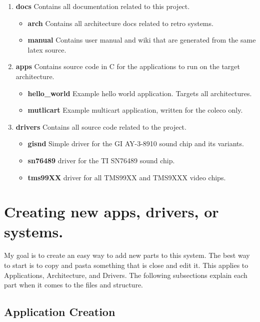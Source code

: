 \documentclass{article}
\begin{document}
  \begin{enumerate}
    \item \textbf{docs} Contains all documentation related to this project.
      \begin{itemize}
        \item \textbf{arch} Contains all architecture docs related to retro systems.
        \item \textbf{manual} Contains user manual and wiki that are generated from the same latex source.
      \end{itemize}
    \item \textbf{apps} Contains source code in C for the applications to run on the target architecture.
      \begin{itemize}
        \item \textbf{hello\_world} Example hello world application. Targets all architectures.
        \item \textbf{mutlicart} Example multicart application, written for the coleco only.
      \end{itemize}
    \item \textbf{drivers} Contains all source code related to the project.
      \begin{itemize}
        \item \textbf{gisnd} Simple driver for the GI AY-3-8910 sound chip and its variants.
        \item \textbf{sn76489} driver for the TI SN76489 sound chip.
        \item \textbf{tms99XX} driver for all TMS99XX and TMS9XXX video chips.
      \end{itemize}
  \end{enumerate}

  \newpage

  \section{Creating new apps, drivers, or systems.}

  \par
  My goal is to create an easy way to add new parts to this system. The best way to start is to copy and pasta something
  that is close and edit it. This applies to Applications, Architecture, and Drivers. The following subsections explain each
  part when it comes to the files and structure.

  \subsection{Application Creation}
\end{document}
